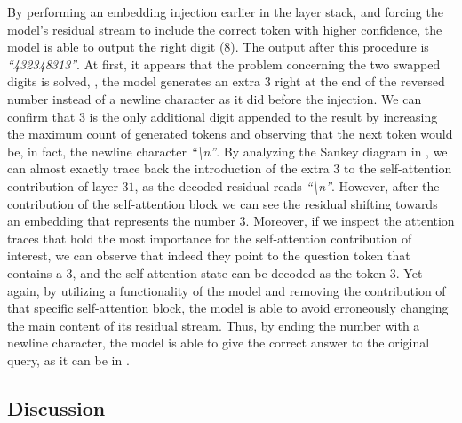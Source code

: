 By performing an embedding injection earlier in the layer stack, and forcing the model's residual stream to include the correct token with higher confidence, the model is  able to output the right digit ($8$).
The output after this procedure is \emph{``432348313''}.
At first, it appears that the problem concerning the two swapped digits is solved, , the model generates an extra $3$ right at the end of the reversed number instead of a newline character as it did before the injection.
We can confirm that $3$ is the only additional digit appended to the result by increasing the maximum count of generated tokens and observing that the next token would be, in fact, the newline character \emph{``\textbackslash{}n''}.
By analyzing the Sankey diagram in , we can almost exactly trace back the introduction of the extra $3$ to the self-attention contribution of layer $31$, as  the decoded residual reads \emph{``\textbackslash{}n''}.
However, after the contribution of the  self-attention block we can see the residual shifting towards an embedding that represents the number $3$.
Moreover, if we inspect the attention traces that hold the most importance for the self-attention contribution of interest, we can observe that indeed they point to the question token that contains a $3$, and the self-attention state  can be decoded as the token $3$.
Yet again, by utilizing a functionality of the model and removing the contribution of that specific self-attention block, the model is able to avoid erroneously changing the main content of its residual stream.
Thus, by ending the number with a newline character, the model is able to give the correct answer to the original query, as it can be  in .


\subsection{Discussion}


